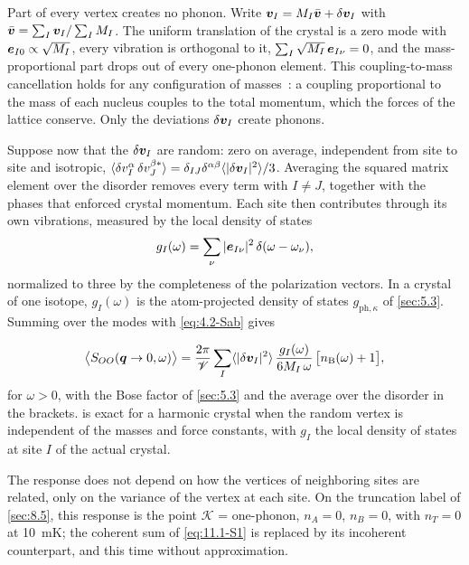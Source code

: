 Part of every vertex creates no phonon. Write $\bm{v}_I = M_I\bar{\bm{v}} + \delta\bm{v}_I$ with $\bar{\bm{v}} = \sum_I\bm{v}_I/\sum_IM_I$. The uniform translation of the crystal is a zero mode with $\bm{e}_{I0} \propto \sqrt{M_I}$, every vibration is orthogonal to it, $\sum_I\sqrt{M_I}\,\bm{e}_{I\nu} = 0$, and the mass-proportional part drops out of every one-phonon element. This coupling-to-mass cancellation holds for any configuration of masses~\cite[Eq.~(44)]{mitridate2024effective}: a coupling proportional to the mass of each nucleus couples to the total momentum, which the forces of the lattice conserve. Only the deviations $\delta\bm{v}_I$ create phonons.

Suppose now that the $\delta\bm{v}_I$ are random: zero on average, independent from site to site and isotropic, $\langle\delta v^\alpha_I\,\delta v^{\beta*}_J\rangle = \delta_{IJ}\delta^{\alpha\beta}\langle|\delta\bm{v}_I|^2\rangle/3$. Averaging the squared matrix element over the disorder removes every term with $I \neq J$, together with the phases that enforced crystal momentum. Each site then contributes through its own vibrations, measured by the local density of states
\begin{equation*}
  g_I(\omega) = \sum_\nu|\bm{e}_{I\nu}|^2\,\delta(\omega - \omega_\nu) ,
\end{equation*}
normalized to three by the completeness of the polarization vectors. In a crystal of one isotope, $g_I(\omega)$ is the atom-projected density of states $g_{\mathrm{ph},\kappa}$ of \cref{sec:5.3}. Summing over the modes with \cref{eq:4.2-Sab} gives
\begin{keyresult}
\begin{equation}
  \bigl\langle S_{OO}(\bm{q}\to0,\omega)\bigr\rangle = \frac{2\pi}{\mathscr{V}}\sum_I\langle|\delta\bm{v}_I|^2\rangle\,\frac{g_I(\omega)}{6M_I\,\omega}\,\bigl[n_{\mathrm{B}}(\omega) + 1\bigr] ,
  \label{eq:11.6-random}
\end{equation}
for $\omega > 0$, with the Bose factor of \cref{sec:5.3} and the average over the disorder in the brackets.  is exact for a harmonic crystal when the random vertex is independent of the masses and force constants, with $g_I$ the local density of states at site $I$ of the actual crystal.
\end{keyresult}
\noindent The response does not depend on how the vertices of neighboring sites are related, only on the variance of the vertex at each site. On the truncation label of \cref{sec:8.5}, this response is the point $\mathcal{K}$ = one-phonon, $n_A = 0$, $n_B = 0$, with $n_T = 0$ at \SI{10}{mK}; the coherent sum of \cref{eq:11.1-S1} is replaced by its incoherent counterpart, and this time without approximation.

